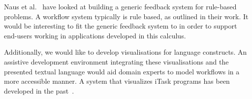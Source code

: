 Naus et al.~\cite{UUCS2017013} have looked at building a generic feedback system for rule-based problems.
A workflow system typically is rule based, as outlined in their work.
It would be interesting to fit the generic feedback system to \TOPHAT in order to support end-users working in applications developed in this calculus.


Additionally, we would like to develop visualisations for \TOPHAT language constructs.
An assistive development environment integrating these visualisations and the presented textual language
would aid domain experts to model workflows in a more accessible manner.
A system that visualizes iTask programs has been developed in the past~\cite{DBLP:conf/sfp/StutterheimPA14}.
